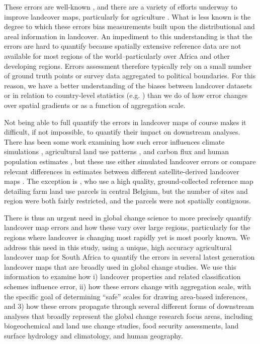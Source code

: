 \documentclass{pnastwo}
\begin{document}
\begin{article}
These errors are well-known \cite{fritz_comparison_2010, fritz_cropland_2011, see_improved_2015, fritz_mapping_2015,verburg_challenges_2011}, and there are a variety of efforts underway to improve landcover maps, particularly for agriculture \cite{fritz_geo-wiki:_2012,estes_diylandcover:_2015}. What is less known is the degree to which these errors bias measurements built upon the distributional and areal information in landcover. An impediment to this understanding is that the errors are hard to quantify because spatially extensive reference data are not available for most regions of the world--particularly over Africa and other developing regions. Errors assessment therefore typically rely on a small number of ground truth points or survey data aggregated to political boundaries. For this reason, we have a better understanding of the biases between landcover datasets or in relation to country-level statistics (e.g. \cite{fritz_comparison_2010,fritz_cropland_2011}) than we do of how error changes over spatial gradients or as a function of aggregation scale. 

Not being able to full quantify the errors in landcover maps of course makes it difficult, if not impossible, to quantify their impact on downstream analyses. There has been some work examining how such error influences climate simulations \cite{ge_impacts_2007}, agricultural land use patterns \cite{schmit_limitations_2006}, and carbon flux \cite{quaife_impact_2008} and human population estimates \cite{linard_assessing_2010}, but these use either simulated landcover errors \cite{ge_impacts_2007} or compare relevant differences in estimates between different satellite-derived landcover maps \cite{linard_assessing_2010, quaife_impact_2008}. The exception is \cite{schmit_limitations_2006}, who use a high quality, ground-collected reference map detailing farm land use parcels in central Belgium, but the number of sites and region were both fairly restricted, and the parcels were not spatially contiguous. 

There is thus an urgent need in global change science to more precisely quantify landcover map errors and how these vary over large regions, particularly for the regions where landcover is changing most rapidly yet is most poorly known.  We address this need in this study, using a unique, high accuracy agricultural landcover map for South Africa to quantify the errors in several latest generation landcover maps that are broadly used in global change studies.  We use this information to examine how i) landcover properties and related classification schemes influence error, ii) how these errors change with aggregation scale, with the specific goal of determining ``safe'' scales for drawing area-based inferences, and 3) how these errors propagate through several different forms of downstream analyses that broadly represent the global change research focus areas, including biogeochemical and land use change studies, food security assessments, land surface hydrology and climatology, and human geography.  



\end{article}
\end{document}
